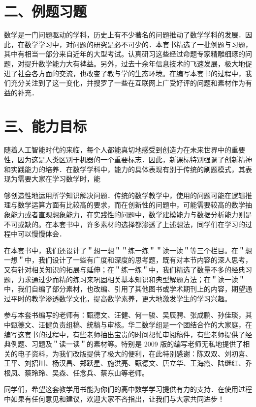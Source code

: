 \documentclass[10pt]{article}
\begin{document}
\section*{二、例题习题}
数学是一门问题驱动的学科，历史上有不少著名的问题推动了数学学科的发展．因此，在数学学习中，对问题的研究是必不可少的．本套书精选了一批例题与习题，其中有相当一部分来自近年的大型考试。认真研习这些经过命题专家精雕细琢的问题，对提升数学能力大有裨益。另外，过去十余年信息技术的飞速发展，极大地促进了社会各方面的交流，也改变了教与学的生态环境。在编写本套书的过程中，我们充分关注到了这一变化，并搜罗了一些在互联网上广受好评的问题和素材作为有益的补充．

\section*{三、能力目标}
随着人工智能时代的来临，每个人都能真切地感受到创造力在未来世界中的重要性，因为这是人类区别于机器的一个重要标志．因此，新课标特别强调了创新精神和实践能力的培养．在数学学科中，能力的具体表现有别于传统的刷题模式，其表现为需要大家在学习数学时，能

够创造性地运用所学知识解决问题．传统的数学教学中，使用的问题可能在逻辑推理与数学运算方面有比较高的要求，而在创新性的问题中，可能需要较高的数学抽象能力或者直观想象能力，在实践性的问题中，数学建模能力与数据分析能力则是不可或缺的。在本套书中，许多素材的选择都渗透了上述想法，同学们在学习的过程中可以慢慢体会．

在本套书中，我们还设计了＂想一想＂＂练一练＂＂读一读＂等三个栏目。在＂想一想＂中，我们设计了一些有广度和深度的思考题，既有对本节内容的深人思考，又有针对相关知识的拓展与延伸；在＂练一练＂中，我们精选了数量不多的经典习题，力求通过少而精的练习来巩固相关基本知识和典型解题方法；在＂读一读＂中，我们自编了部分素材，也改编、引用了其他图书或学术期刊上的内容，期望通过平时的教学渗透数学文化，提高数学素养，更大地激发学生的学习兴趣。

参与本套书编写的老师有：甄德文、汪健、何一骏、吴辰骋、张成鹏、孙佳琰，其中甄德文、汪健负责组稿、统稿与审核。华二数学组是一个团结合作的大家庭，在编写这套书的过程中，有些老师抽出宝贵的时间帮忙审阅稿件，有些老师提供了经典例题、习题及＂读一读＂的素材等。特别是 2009 版的编写老师无私地提供了相关的电子资料，为我们改版提供了极大的便利，在此特别感谢：陈双双、刘初喜、王平、刘招川、杨汉昌、郑跃星、施洪亮、甄德文、唐立华、王海霞、陆继红、乔根凤、蔡玲玲、吴森、任念兵、蔡东山等老师。

同学们，希望这套教学用书能为你们的高中数学学习提供有力的支持．在使用过程中如果有任何意见和建议，欢迎大家不吝指出，让我们与大家共同进步！
\end{document}
